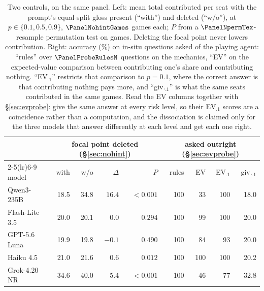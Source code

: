 \begin{table}[t]
\centering
\small
\setlength{\tabcolsep}{3.0pt}
\begin{tabular}{lrrrrrrrr}
\toprule
 & \multicolumn{4}{c}{focal point deleted (\S\ref{sec:nohint})} & \multicolumn{4}{c}{asked outright (\S\ref{sec:evprobe})} \\
\cmidrule(lr){2-5}\cmidrule(lr){6-9}
model & with & w/o & $\Delta$ & $P$ & rules & EV & EV$_{.1}$ & giv.$_{.1}$ \\
\midrule
Qwen3-235B & 18.5 & 34.8 & $16.4$ & ${<}0.001$ & 100 & 33 & 100 & 18.0 \\
Flash-Lite 3.5 & 20.0 & 20.1 & $0.0$ & $0.294$ & 100 & 99 & 100 & 20.0 \\
GPT-5.6 Luna & 19.9 & 19.8 & $-0.1$ & $0.490$ & 100 & 84 & 93 & 20.0 \\
Haiku 4.5 & 21.0 & 21.6 & $0.6$ & $0.012$ & 100 & 100 & 100 & 20.2 \\
Grok-4.20 NR & 34.6 & 40.0 & $5.4$ & ${<}0.001$ & 100 & 46 & 77 & 32.8 \\
\bottomrule
\end{tabular}
\caption{Two controls, on the same panel. Left: mean total contributed per seat with the prompt's equal-split gloss present (``with'') and deleted (``w/o''), at $p\in\{0.1,0.5,0.9\}$, $\PanelNohintGames$ games each; $P$ from a $\PanelNpermTex$-resample permutation test on games. Deleting the focal point never lowers contribution. Right: accuracy (\%) on in-situ questions asked of the playing agent: ``rules'' over $\PanelProbeRulesN$ questions on the mechanics, ``EV'' on the expected-value comparison between contributing one's share and contributing nothing. ``EV$_{.1}$'' restricts that comparison to $p=0.1$, where the correct answer is that contributing nothing pays more, and ``giv.$_{.1}$'' is what the same seats contributed in the same games. Read the EV columns together with \S\ref{sec:evprobe}: \PanelProbeConstantModels{} give the same answer at every risk level, so their EV$_{.1}$ scores are a coincidence rather than a computation, and the dissociation is claimed only for the three models that answer differently at each level and get each one right.}
\label{tab:controls}
\end{table}
